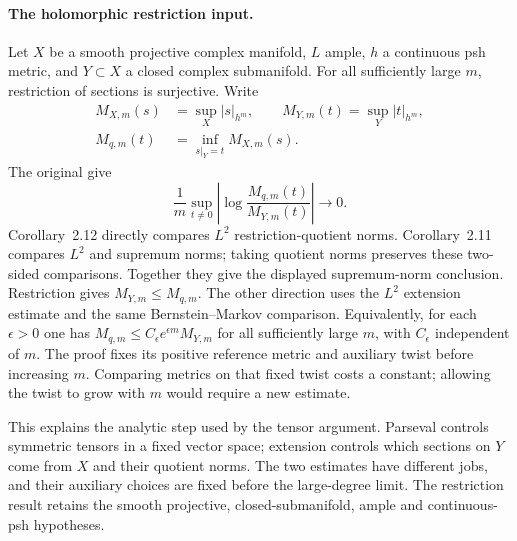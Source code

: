 \paragraph{The holomorphic restriction input.}
Let $X$ be a smooth projective complex manifold, $L$ ample,
$h$ a continuous psh metric, and $Y\subset X$ a closed
complex submanifold. For all sufficiently large $m$,
restriction of sections is surjective. Write
\[
 \begin{aligned}
 M_{X,m}(s)&=\sup_X|s|_{h^m},\qquad
 M_{Y,m}(t)=\sup_Y|t|_{h^m},\\
 M_{q,m}(t)&=\inf_{s|_Y=t}M_{X,m}(s).
 \end{aligned}
\]
The original \cite[Corollaries~2.11--2.12, arXiv version~2]{Fin22}
give
\[
 \frac1m\sup_{t\ne0}
       \left|\log\frac{M_{q,m}(t)}{M_{Y,m}(t)}\right|
       \longrightarrow0.
\]
Corollary~2.12 directly compares $L^2$ restriction-quotient
norms. Corollary~2.11 compares $L^2$ and supremum norms;
taking quotient norms preserves these two-sided comparisons.
Together they give the displayed supremum-norm conclusion.
Restriction gives $M_{Y,m}\leq M_{q,m}$. The other direction
uses the $L^2$ extension estimate and the same
Bernstein--Markov comparison.
Equivalently, for each $\epsilon>0$ one has
$M_{q,m}\leq C_\epsilon e^{\epsilon m}M_{Y,m}$ for all
sufficiently large $m$, with $C_\epsilon$ independent of $m$.
The proof fixes its positive reference metric and auxiliary
twist before increasing $m$. Comparing metrics on that fixed
twist costs a constant; allowing the twist to grow with $m$
would require a new estimate.

This explains the analytic step used by the tensor argument.
Parseval controls symmetric tensors in a fixed vector space;
extension controls which sections on $Y$ come from $X$ and
their quotient norms. The two estimates have different jobs,
and their auxiliary choices are fixed before the large-degree
limit. The restriction result retains the smooth projective,
closed-submanifold, ample and continuous-psh hypotheses.
